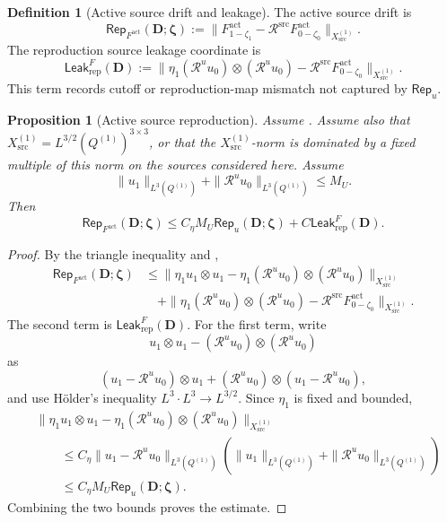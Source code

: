 \documentclass[11pt]{article}
\numberwithin{equation}{section}
\newtheorem{proposition}[proposition]{Proposition}
\theoremstyle{definition}
\newtheorem{definition}[definition]{Definition}
\theoremstyle{remark}
\newcommand{\src}{\mathrm{src}}
\newcommand{\rep}{\mathrm{rep}}
\newcommand{\Leak}{\mathsf{Leak}}
\newcommand{\Rep}{\mathsf{Rep}}
\newcommand{\calR}{\mathcal R}
\newcommand{\bD}{\mathbf D}
\newcommand{\bzeta}{\boldsymbol\zeta}
\newcommand{\Xsrc}{X_{\src}}
\begin{document}
\begin{definition}[Active source drift and leakage]
\label{rep:def:active-source-drift}
The active source drift is
\[
    \Rep_{F^{\mathrm{act}}}(\bD;\bzeta)
    :=
    \|F^{\mathrm{act}}_{1-\zeta_1}
    -
    \calR^{\src}F^{\mathrm{act}}_{0-\zeta_0}\|_{\Xsrc^{(1)}}.
\]
The reproduction source leakage coordinate is
\[
    \Leak_{\rep}^{F}(\bD)
    :=
    \|\eta_1(\calR^u u_0)\otimes(\calR^u u_0)
    -
    \calR^{\src}F^{\mathrm{act}}_{0-\zeta_0}\|_{\Xsrc^{(1)}}.
\]
This term records cutoff or reproduction-map mismatch not captured by
\(\Rep_u\).
\end{definition}

\begin{proposition}[Active source reproduction]
\label{rep:prop:active-source-reproduction}
Assume .  Assume also that
\(\Xsrc^{(1)}=L^{3/2}(Q^{(1)})^{3\times3}\), or that the
\(\Xsrc^{(1)}\)-norm is dominated by a fixed multiple of this norm on the
sources considered here.
Assume
\[
    \|u_1\|_{L^3(Q^{(1)})}
    +
    \|\calR^u u_0\|_{L^3(Q^{(1)})}
    \le
    M_U.
\]
Then
\[
    \Rep_{F^{\mathrm{act}}}(\bD;\bzeta)
    \le
    C_\eta M_U\Rep_u(\bD;\bzeta)
    +
    C\Leak_{\rep}^{F}(\bD).
\]
\end{proposition}

\begin{proof}
By the triangle inequality and ,
\[
\begin{aligned}
    \Rep_{F^{\mathrm{act}}}(\bD;\bzeta)
    &\le
    \|\eta_1u_1\otimes u_1
    -
    \eta_1(\calR^u u_0)\otimes(\calR^u u_0)\|_{\Xsrc^{(1)}}\\
    &\quad+
    \|\eta_1(\calR^u u_0)\otimes(\calR^u u_0)
    -
    \calR^{\src}F^{\mathrm{act}}_{0-\zeta_0}\|_{\Xsrc^{(1)}}.
\end{aligned}
\]
The second term is \(\Leak_{\rep}^{F}(\bD)\).  For the first term, write
\[
    u_1\otimes u_1
    -
    (\calR^u u_0)\otimes(\calR^u u_0)
\]
as
\[
    (u_1-\calR^u u_0)\otimes u_1
    +
    (\calR^u u_0)\otimes (u_1-\calR^u u_0),
\]
and use Hölder's inequality \(L^3\cdot L^3\to L^{3/2}\).  Since
\(\eta_1\) is fixed and bounded,
\[
\begin{aligned}
    &\|\eta_1u_1\otimes u_1
    -
    \eta_1(\calR^u u_0)\otimes(\calR^u u_0)\|_{\Xsrc^{(1)}}\\
    &\qquad\le
    C_\eta
    \|u_1-\calR^u u_0\|_{L^3(Q^{(1)})}
    \left(
        \|u_1\|_{L^3(Q^{(1)})}
        +
        \|\calR^u u_0\|_{L^3(Q^{(1)})}
    \right)\\
    &\qquad\le
    C_\eta M_U\Rep_u(\bD;\bzeta).
\end{aligned}
\]
Combining the two bounds proves the estimate.
\end{proof}
\end{document}
